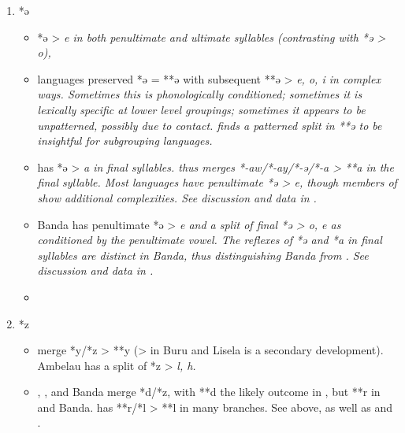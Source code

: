 \begin{enumerate}
\begin{itemize}[topsep=0pt,leftmargin=\dimexpr 15pt-6pt]
			\item	Most  languages have *q/*h > {\0},
						but Watubela has *q > \it{k} in all positions ().
		\end{itemize}
	\item	*ə
		\begin{itemize}[topsep=0pt,leftmargin=\dimexpr 15pt-6pt]
			\item	{} *ə > \it{e} in both penultimate
						and ultimate syllables (contrasting with  *ə > \it{o}),
			\item	{} languages preserved *ə = **ə with subsequent
						**ə > \it{e, o, i} in complex ways.
						Sometimes this is phonologically conditioned; sometimes it is
						lexically specific at lower level groupings; sometimes it appears
						to be unpatterned, possibly due to contact.
						\citet[65ff]{Collins1983} finds a patterned split in **ə to be insightful
						for subgrouping  languages.
			\item	{} has *ə > \it{a} in final syllables.
						 thus merges *-aw/*-ay/*-ə/*-a >
						**a in the final syllable.
						Most  languages have penultimate
						*ə > \it{e,} though members of  show additional complexities.
						See discussion and data in .
			\item	Banda has penultimate *ə > \it{e}
						and a split of final *ə > \it{o,
						e} as conditioned by the penultimate vowel.
						The reflexes of *ə
						and *a in final syllables are distinct in Banda,
						thus distinguishing Banda from .
						See discussion and data in .
			\item[] \hp{\,}
		\end{itemize}
	\item	*z
		\begin{itemize}[topsep=0pt,leftmargin=\dimexpr 15pt-6pt]
			\item	{} merge *y/*z > **y (> {\0} in Buru
						and Lisela is a secondary development).
						Ambelau has a split of *z > \it{l, h}.
			\item	{},
						, and Banda merge *d/*z,
						with **d the likely outcome in ,
						but **r in  and Banda.
						 has **r/*l > **l in many branches.
						See  above, as well as  and .

\end{itemize}
\end{enumerate}
